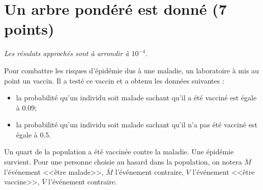 \section{Un arbre pondéré est donné (7 points)}

\emph{Les résulats approchés sont à arrondir à $10^{-4}$.}

Pour combattre les risques d'épidémie dus à une maladie, un laboratoire à mis au point un vaccin. Il a testé ce vaccin et a obtenu les données suivantes :
\begin{itemize}
	\item la probabilité qu'un individu soit malade sachant qu'il a été vacciné est égale à \num{0.09};
	\item la probabilité qu'un individu soit malade sachant qu'il n'a pas été vacciné est égale à \num{0.5}.
\end{itemize} 

Un quart de la population a été vaccinée contre la maladie. Une épidémie survient. Pour une personne choisie au hasard dans la population, on notera $M$l'événement <<être malade>>, $\bar{M}$ l'événement contraire, $V$ l'événement <<être vaccine>>, $\bar{V}$ l'événement contraire.

